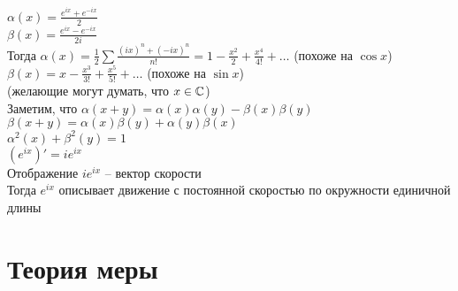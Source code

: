 \documentclass[12pt]{article}
\begin{document}
$\alpha(x) = \frac{e^{ix}+e^{-ix}}{2}$\\
$\beta(x) = \frac{e^{ix}-e^{-ix}}{2i}$\\
Тогда $\alpha(x) = \frac12 \sum\frac{(ix)^n+(-ix)^n}{n!} = 1 - \frac{x^2}{2} + \frac{x^4}{4!} + \ldots$ (похоже на $\cos x$)\\
$\beta(x) = x - \frac{x^3}{3!} + \frac{x^5}{5!}  + \ldots$ (похоже на $\sin x$)\\
(желающие могут думать, что $x\in \mathbb{C}$)\\
Заметим, что $\alpha(x+y) = \alpha(x)\alpha(y) - \beta(x)\beta(y)$\\
$\beta(x+y) = \alpha(x)\beta(y) + \alpha(y)\beta(x)$\\
$\alpha^2(x) + \beta^2(y) = 1$\\
$(e^{ix})' = ie^{ix}$\\
Отображение $ie^{ix}$ -- вектор скорости\\
Тогда $e^{ix}$ описывает движение с постоянной скоростью по окружности единичной длины\\
\section{Теория меры}
\end{document}
